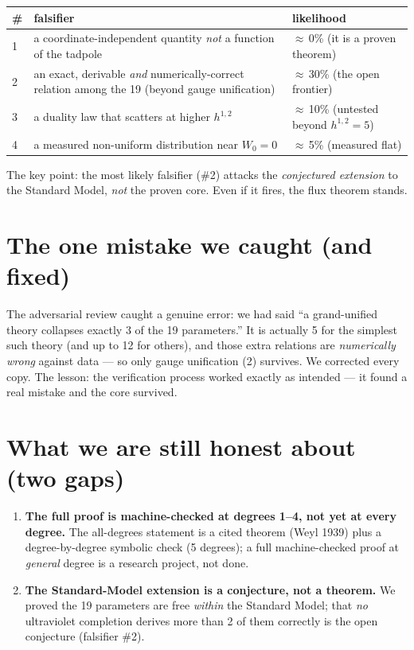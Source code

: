 \documentclass[11pt]{article}
\begin{document}
\begin{center}
\begin{tabular}{lp{6.5cm}l}
\toprule
\# & falsifier & likelihood \\
\midrule
1 & a coordinate-independent quantity \emph{not} a function of the tadpole & $\approx$\,0\% (it is a proven theorem) \\
2 & an exact, derivable \emph{and} numerically-correct relation among the 19 (beyond gauge unification) & $\approx$\,30\% (the open frontier) \\
3 & a duality law that scatters at higher $h^{1,2}$ & $\approx$\,10\% (untested beyond $h^{1,2}=5$) \\
4 & a measured non-uniform distribution near $W_0=0$ & $\approx$\,5\% (measured flat) \\
\bottomrule
\end{tabular}
\end{center}

The key point: the most likely falsifier (\#2) attacks the \emph{conjectured extension} to
the Standard Model, \emph{not} the proven core. Even if it fires, the flux theorem stands.

\section*{The one mistake we caught (and fixed)}

The adversarial review caught a genuine error: we had said ``a grand-unified theory
collapses exactly 3 of the 19 parameters.'' It is actually 5 for the simplest such theory
(and up to 12 for others), and those extra relations are \emph{numerically wrong} against
data --- so only gauge unification (2) survives. We corrected every copy. The lesson: the
verification process worked exactly as intended --- it found a real mistake and the core
survived.

\section*{What we are still honest about (two gaps)}

\begin{enumerate}[leftmargin=1.4em]
\item \textbf{The full proof is machine-checked at degrees 1--4, not yet at every degree.}
  The all-degrees statement is a cited theorem (Weyl 1939) plus a degree-by-degree
  symbolic check (5 degrees); a full machine-checked proof at \emph{general} degree is a
  research project, not done.
\item \textbf{The Standard-Model extension is a conjecture, not a theorem.} We proved the
  19 parameters are free \emph{within} the Standard Model; that \emph{no} ultraviolet
  completion derives more than 2 of them correctly is the open conjecture (falsifier \#2).
\end{enumerate}
\end{document}
